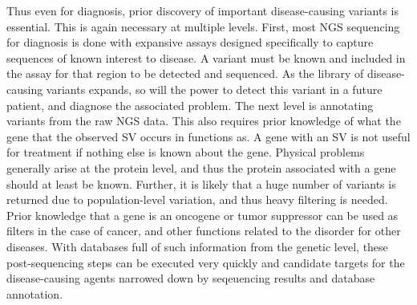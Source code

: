 \documentclass{easychithesis}
\begin{document}
Thus even for diagnosis, prior discovery of important disease-causing variants is essential. This is again necessary at multiple levels. First, most NGS sequencing for diagnosis is done with expansive assays designed specifically to capture sequences of known interest to disease. A variant must be known and included in the assay for that region to be detected and sequenced. As the library of disease-causing variants expands, so will the power to detect this variant in a future patient, and diagnose the associated problem. The next level is annotating variants from the raw NGS data. This also requires prior knowledge of what the gene that the observed SV occurs in functions as. A gene with an SV is not useful for treatment if nothing else is known about the gene. Physical problems generally arise at the protein level, and thus the protein associated with a gene should at least be known. Further, it is likely that a huge number of variants is returned due to population-level variation, and thus heavy filtering is needed. Prior knowledge that a gene is an oncogene or tumor suppressor can be used as filters in the case of cancer, and other functions related to the disorder for other diseases. With databases full of such information from the genetic level, these post-sequencing steps can be executed very quickly and candidate targets for the disease-causing agents narrowed down by seqeuencing results and database annotation.
\end{document}
